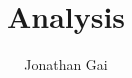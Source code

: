 
\usepackage{bbm}
\usepackage{nicefrac}
\author{Jonathan Gai}
\title{Analysis}


\maketitle
\tableofcontents
{}
